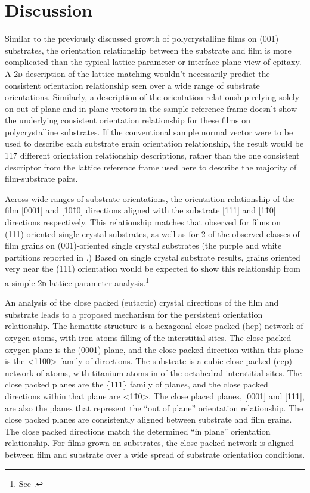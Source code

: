 \section{Discussion}
\label{sec:poly.growth.discussion}
		
		
Similar to the previously discussed growth of polycrystalline  films on
 (001) substrates, the orientation relationship between the substrate and film
is more complicated than the typical lattice parameter or interface plane view of epitaxy.
A 2\textsc{d} description of the lattice matching wouldn't necessarily predict the
consistent orientation relationship seen over a wide range of substrate orientations.
Similarly, a description of the orientation relationship relying solely on out of plane
and in plane vectors in the sample reference frame doesn't show the underlying consistent
orientation relationship for these films on polycrystalline substrates. If the
conventional sample normal vector were to be used to describe each substrate grain
orientation relationship, the result would be 117 different orientation relationship
descriptions, rather than the one consistent descriptor from the lattice reference frame
used here to describe the majority of film-substrate pairs.

Across wide ranges of substrate orientations, the orientation relationship of the film
[0001] and [10\={1}0] directions aligned with the substrate [111] and [1\={1}0] directions
respectively. This relationship matches that observed for films on (111)-oriented single
crystal substrates, as well as for 2 of the observed classes of film grains on
(001)-oriented single crystal substrates (the purple and white partitions reported in
.) Based on single crystal substrate
results, grains oriented very near the (111) orientation would be expected to show this
relationship from a simple 2\textsc{d} lattice parameter analysis.\footnote{See
.}

An analysis of the close packed (eutactic)\cite{OKeeffe:1977vx} crystal directions of the
film and substrate leads to a proposed mechanism for the persistent orientation
relationship. The hematite structure is a hexagonal close packed (hcp) network of oxygen
atoms, with iron atoms filling  of the interstitial sites. The close
packed oxygen plane is the (0001) plane, and the close packed direction within this plane
is the <1\={1}00> family of directions. The  substrate is a cubic close packed
(ccp) network of  atoms, with titanium atoms in  of the
octahedral interstitial sites. The close packed planes are the \{111\} family of planes,
and the close packed directions within that plane are <1\={1}0>. The close placed planes,
[0001] and [111], are also the planes that represent the ``out of
plane'' orientation relationship. The close packed planes are consistently aligned between
substrate and film grains. The close packed directions match the determined ``in plane''
orientation relationship. For  films grown on  substrates, the close
packed network is aligned between film and substrate over a wide spread of substrate
orientation conditions.

